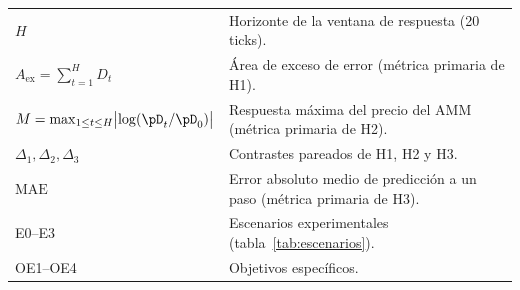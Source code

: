 \begin{center}
\begin{tabularx}{\textwidth}{@{}l X@{}}
$H$ & Horizonte de la ventana de respuesta (20 ticks). \\
$A_{\mathrm{ex}} = \sum_{t=1}^{H} D_t$ & Área de exceso de error (métrica primaria de H1). \\
$M = \max_{1\le t\le H}\bigl|\log(\pD_t/\pD_0)\bigr|$ & Respuesta máxima del precio del AMM (métrica primaria de H2). \\
$\Delta_1,\Delta_2,\Delta_3$ & Contrastes pareados de H1, H2 y H3. \\
$\mathrm{MAE}$ & Error absoluto medio de predicción a un paso (métrica primaria de H3). \\
E0--E3 & Escenarios experimentales (tabla~\ref{tab:escenarios}). \\
OE1--OE4 & Objetivos específicos. \\
\bottomrule
\end{tabularx}
\end{center}
